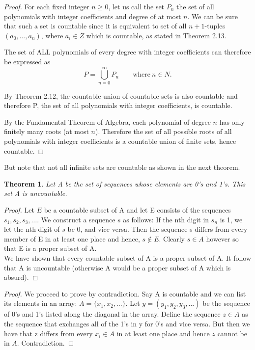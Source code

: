 \documentclass{tufte-book}
\newtheorem{theorem}{Theorem}[chapter]
\theoremstyle{definition}
\numberwithin{section}{chapter}
\begin{document}
\begin{proof} 
For each fixed integer $n \geq 0$, let us call the set $P_{n}$ the set of all polynomials with integer coefficients and degree of at most $n$.  We can be sure that such a set is countable since it is equivalent to set of all $n+1$-tuples $(a_{0}, \ldots, a_{n})$, where $a_{i} \in Z$ which is countable, as stated in Theorem 2.13.  

The set of ALL polynomials of every degree with integer coefficients can therefore be expressed as
$$   P = \bigcup^{\infty}_{n=0} P_{n} \qquad \text{where} \ n \in N.$$


By Theorem 2.12, the countable union of countable sets is also countable and therefore P, the set of all polynomials with integer coefficients, is countable.

By the Fundamental Theorem of Algebra, each polynomial of degree $n$ has only finitely many roots (at most $n$). Therefore the set of all possible roots of all polynomials with integer coefficients is a countable union of finite sets, hence countable.
\end{proof}


But note that not all infinite sets are countable as shown in the next theorem.

\begin{theorem} Let A be the set of sequences whose elements are 0's and 1's.  This set A is uncountable. \end{theorem}

\begin{proof}
Let $E$ be a countable subset of A and let E consists of the sequences $s_1, s_2, s_3, \ldots$.   We construct a sequence $s$ as follows: If the nth digit in $s_n$ is 1, we let the nth digit of $s$ be 0, and vice versa.  Then the sequence s differs from every member of E in at least one place and hence, $s \notin E$.  Clearly $s \in A$ however so that E is a proper subset of A.\\

We have shown that every countable subset of A is a proper subset of A.  It follow that A is uncountable (otherwise A would be a proper subset of A which is absurd).
\end{proof}

\begin{proof} 

We proceed to prove by contradiction.  Say A is countable and we can list its elements in an array:  $A = \{x_1, x_2, \ldots \}$.  Let $y = (y_1, y_2, y_3, \ldots)$ be the sequence of 0's and 1's listed along the diagonal in the array.   Define the sequence $z \in A$ as the sequence that exchanges all of the 1's in y for 0's and vice versa.  But then we have that z differs from every $x_i \in A$ in at least one place and hence $z$ cannot be in $A$.  Contradiction.

\end{proof}
\end{document}
